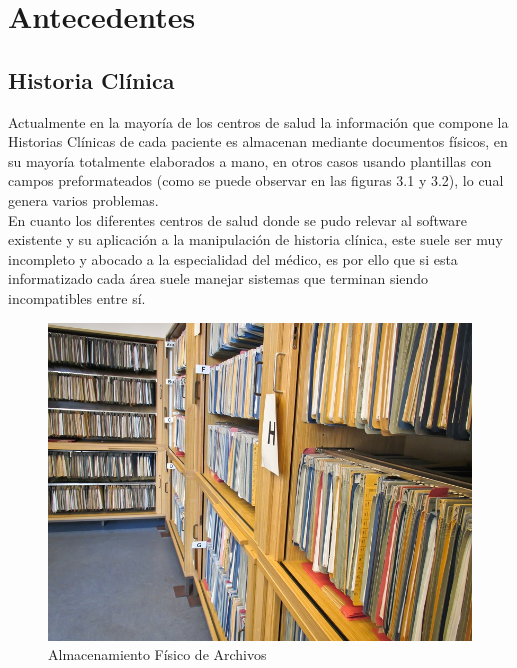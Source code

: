 \chapter{Antecedentes}

\section{Historia Clínica}

Actualmente en la mayoría de los centros de salud la información que compone la Historias Clínicas de cada paciente es almacenan mediante documentos físicos, en su mayoría totalmente elaborados a mano, en otros casos usando plantillas con campos preformateados (como se puede observar en las figuras 3.1 y 3.2), lo cual genera varios problemas.\\[0.1cm]

En cuanto los diferentes centros de salud donde se pudo relevar al software existente y su aplicación a la manipulación de historia clínica, este suele ser muy incompleto y abocado a la especialidad del médico, es por ello que si esta informatizado cada área suele manejar sistemas que terminan siendo incompatibles entre sí.\\[0.1cm]

\begin{figure}[h]
    \centering
    \includegraphics[scale=1.5]{resourse/folders-archivos.jpg}
    \caption{Almacenamiento Físico de Archivos}
    \label{fig:05}
\end{figure}  


